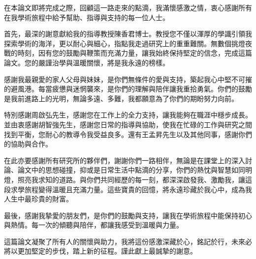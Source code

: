 \begin{Thanks}
    在本論文即將完成之際，回顧這一路走來的點滴，我滿懷感激之情，衷心感謝所有在我學術旅程中給予幫助、指導與支持的每一位人士。

    首先，最深的謝意獻給我的指導教授陳香君博士。教授您不僅以渾厚的學識引領我探索學術的海洋，更以耐心與細心，指點我走過研究上的重重難關。無數個挑燈夜戰的時刻，因有您的鼓勵與鞭策而充滿力量，讓我始終保持堅定的信念，完成這篇論文。您的嚴謹治學與溫暖關懷，將是我永遠的榜樣。

    感謝我最親愛的家人父母與妹妹，是你們無條件的愛與支持，築起我心中堅不可摧的避風港。每當疲憊與迷惘襲來，是你們的理解與陪伴讓我重拾勇氣。你們的鼓勵是我前進路上的光明，無論多遠、多難，我都願意為了你們的期盼努力向前。

    特別感謝周啟弘先生，感謝您在工作上的全力支持，讓我能夠在職涯中穩步成長。並由衷感謝胡智強先生，感謝您日常的指導與協助，使我在忙碌的工作與研究之間找到平衡，您耐心的教導令我受益良多。還有王孟昇先生以及其他同事，感謝你們的協助與合作。

    在此亦要感謝所有研究所的夥伴們，謝謝你們一路相伴，無論是在課堂上的深入討論、論文中的思想碰撞，抑或是日常生活中點滴的分享，你們的熱忱與智慧如同明燈，照亮我求知的道路。與你們共同經歷的每一刻，都深深啟發我、激勵我，讓這段求學旅程變得溫暖且充滿力量。這些寶貴的回憶，將永遠珍藏於我心中，成為我人生中最珍貴的財富。

    最後，感謝我摯愛的朋友們，是你們的鼓勵與支持，讓我在學術旅程中能保持初心與熱情。每一次的傾聽與陪伴，都讓我感受到溫暖與力量。

    這篇論文凝聚了所有人的關懷與助力，我將這份感激深藏於心，銘記於行，未來必將以更加堅定的步伐，踏上新的征程。謹此獻上最誠摯的謝意。



\end{Thanks}
